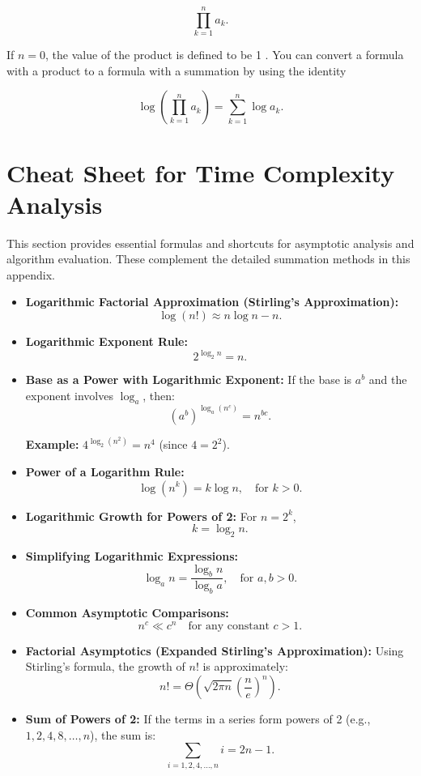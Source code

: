 \[
\prod_{k=1}^n a_k .
\]


If $n=0$, the value of the product is defined to be 1 . You can convert a formula with a product to a formula with a summation by using the identity

\[
\log \left(\prod_{k=1}^n a_k\right)=\sum_{k=1}^n \log a_k .
\]

\section*{Cheat Sheet for Time Complexity Analysis}

This section provides essential formulas and shortcuts for asymptotic analysis and algorithm evaluation. These complement the detailed summation methods in this appendix.

\begin{itemize}
    \item \textbf{Logarithmic Factorial Approximation (Stirling's Approximation):} 
    \[
    \log(n!) \approx n \log n - n.
    \]
 
    \item \textbf{Logarithmic Exponent Rule:} 
    \[
    2^{\log_2 n} = n.
    \]

    \item \textbf{Base as a Power with Logarithmic Exponent:} 
    If the base is \( a^b \) and the exponent involves \( \log_a \), then:
    \[
    (a^b)^{\log_a(n^c)} = n^{bc}.
    \]
    
    \textbf{Example:} \( 4^{\log_2(n^2)} = n^4 \) (since \( 4 = 2^2 \)).
    
    \item \textbf{Power of a Logarithm Rule:} 
    \[
    \log(n^k) = k \log n, \quad \text{for } k > 0.
    \]
    
    \item \textbf{Logarithmic Growth for Powers of 2:} 
    For \( n = 2^k \),
    \[
    k = \log_2 n.
    \]
    
    \item \textbf{Simplifying Logarithmic Expressions:} 
    \[
    \log_a n = \frac{\log_b n}{\log_b a}, \quad \text{for } a, b > 0.
    \]
    
    \item \textbf{Common Asymptotic Comparisons:} 
    \[
    n^c \ll c^n \quad \text{for any constant } c > 1.
    \]
    
    \item \textbf{Factorial Asymptotics (Expanded Stirling's Approximation):} 
    Using Stirling's formula, the growth of \( n! \) is approximately:
    \[
    n! = \Theta\left(\sqrt{2\pi n} \left(\frac{n}{e}\right)^n\right).
    \]
    
    \item \textbf{Sum of Powers of 2:} 
    If the terms in a series form powers of 2 (e.g., \( 1, 2, 4, 8, \ldots, n \)), the sum is:
    \[
    \sum_{i=1,2,4,\ldots,n} i = 2n - 1.
    \]

\end{itemize}
